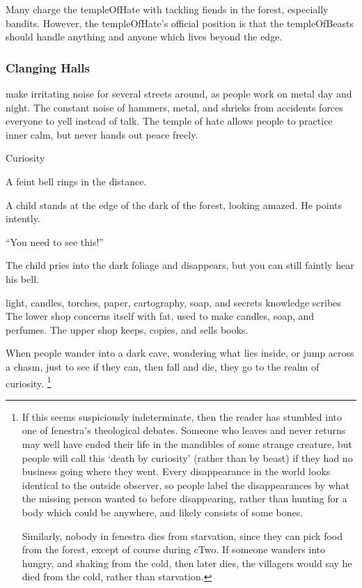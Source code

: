 \begin{multicols}{2}
Many charge the \gls{templeOfHate} with tackling \glspl{fiend} in the forest, especially bandits.
However, the \gls{templeOfHate}'s official position is that the \gls{templeOfBeasts} should handle anything and anyone which lives beyond the \gls{edge}.

\subsubsection{Clanging Halls}
make irritating noise for several streets around, as people work on metal day and night.
The constant noise of hammers, metal, and shrieks from accidents forces everyone to yell instead of talk.
The temple of hate allows people to practice inner calm, but never hands out peace freely.

  {Curiosity}%
  {
    A feint bell rings in the distance.

    A child stands at the edge of the dark of the forest, looking amazed.
    He points intently.

    {\sffamily``You need to see this!''}

    The child pries into the dark foliage and disappears, but you can still faintly hear his bell.
  }%
  {light, candles, torches, paper, cartography, soap, and secrets}%
  {knowledge}%
  {\Glspl{scribe}}%
  {
    The lower shop concerns itself with fat, used to make candles, soap, and perfumes.
    The upper shop keeps, copies, and sells books.
  }%


When people wander into a dark cave, wondering what lies inside, or jump across a chasm, just to see if they can, then fall and die, they go to the realm of curiosity.%
\footnote{If this seems suspiciously indeterminate, then the reader has stumbled into one of \gls{fenestra}'s theological debates.
Someone who leaves and never returns may well have ended their life in the mandibles of some strange creature, but people will call this `death by curiosity' (rather than by beast) if they had no business going where they went.
Every disappearance in the world looks identical to the outside observer, so people label the disappearances by what the missing person wanted to before disappearing, rather than hunting for a body which could be anywhere, and likely consists of some bones.

Similarly, nobody in \gls{fenestra} dies from starvation, since they can pick food from the forest, except of course during \gls{cTwo}.
If someone wanders into  hungry, and shaking from the cold, then later dies, the villagers would say he died from the cold, rather than starvation.}


\end{multicols}
